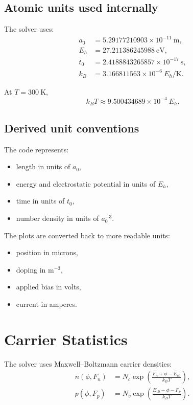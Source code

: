 \documentclass[11pt]{article}
\begin{document}
\subsection{Atomic units used internally}

The solver uses:
\begin{align*}
    a_0 &= 5.29177210903 \times 10^{-11}\ \mathrm{m}, \\
    E_h &= 27.211386245988\ \mathrm{eV}, \\
    t_0 &= 2.4188843265857 \times 10^{-17}\ \mathrm{s}, \\
    k_B &= 3.166811563 \times 10^{-6}\ E_h/\mathrm{K}.
\end{align*}

At $T=300\ \mathrm{K}$,
\[
    k_B T \approx 9.500434689 \times 10^{-4}\ E_h.
\]

\subsection{Derived unit conventions}

The code represents:
\begin{itemize}
    \item length in units of $a_0$,
    \item energy and electrostatic potential in units of $E_h$,
    \item time in units of $t_0$,
    \item number density in units of $a_0^{-3}$.
\end{itemize}

The plots are converted back to more readable units:
\begin{itemize}
    \item position in microns,
    \item doping in $\mathrm{m}^{-3}$,
    \item applied bias in volts,
    \item current in amperes.
\end{itemize}

\section{Carrier Statistics}

The solver uses Maxwell--Boltzmann carrier densities:
\begin{align}
    n(\phi,F_n) &= N_c \exp\!\left(\frac{F_n + \phi - E_{c0}}{k_B T}\right), \\
    p(\phi,F_p) &= N_v \exp\!\left(\frac{E_{v0} - \phi - F_p}{k_B T}\right).
\end{align}
\end{document}
